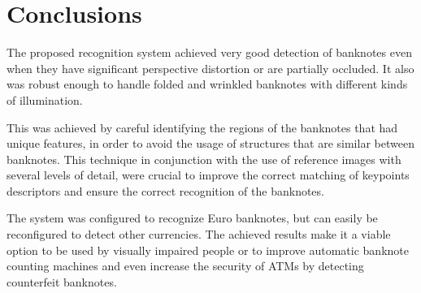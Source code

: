 \section{Conclusions}\label{sec:conclusions}

The proposed recognition system achieved very good detection of banknotes even when they have significant perspective distortion or are partially occluded. It also was robust enough to handle folded and wrinkled banknotes with different kinds of illumination.

This was achieved by careful identifying the regions of the banknotes that had unique features, in order to avoid the usage of structures that are similar between banknotes. This technique in conjunction with the use of reference images with several levels of detail, were crucial to improve the correct matching of keypoints descriptors and ensure the correct recognition of the banknotes.

The system was configured to recognize Euro banknotes, but can easily be reconfigured to detect other currencies.
The achieved results make it a viable option to be used by visually impaired people or to improve automatic banknote counting machines and even increase the security of ATMs by detecting counterfeit banknotes.
